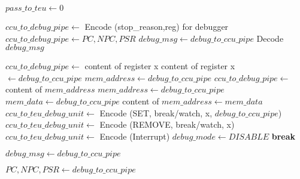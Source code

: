 	 \begin{algorithm}
	 	\begin{algorithmic}
	 		\State {} 		
	 		\State {}
	 		\State {}
	 		\Else
	 		\State $pass\_to\_teu \gets 0$
	 		\EndIf
	 		\EndWhile
 		\EndWhile
 		\EndFunction
 		
 		\State $ccu\_to\_debug\_pipe \gets $ Encode (stop\_reason,reg) for debugger
 		\State $ccu\_to\_debug\_pipe \gets PC, NPC, PSR$
 		\EndIf
 		\State $debug\_msg \gets debug\_to\_ccu\_pipe$
 		\State Decode $debug\_msg$ 		
 		
 		\State $ccu\_to\_debug\_pipe \gets $ content of register x
 		\State content of register x $\gets debug\_to\_ccu\_pipe$
 		\State $mem\_address \gets debug\_to\_ccu\_pipe$
 		\State $ccu\_to\_debug\_pipe \gets $ content of $mem\_address$
 		\State $mem\_address \gets debug\_to\_ccu\_pipe$
 		\State $mem\_data \gets debug\_to\_ccu\_pipe$
 		\State content of $mem\_address \gets mem\_data$
 		\State $ccu\_to\_teu\_debug\_unit \gets $ Encode (SET, break/watch, x, $debug\_to\_ccu\_pipe$)
 		\State $ccu\_to\_teu\_debug\_unit \gets $ Encode (REMOVE, break/watch, x)
 		\State $ccu\_to\_teu\_debug\_unit \gets $ Encode (Interrupt)
 		\State $debug\_mode \gets DISABLE$
 		\State \textbf{break}
 		\EndIf
 		
 		\State $debug\_msg \gets debug\_to\_ccu\_pipe$	
 		\EndWhile
 		
 		\State $PC, NPC, PSR \gets debug\_to\_ccu\_pipe$
 		\EndIf
 		
 		\EndFunction
 	\end{algorithmic}
 \end{algorithm}
 
 \newpage
